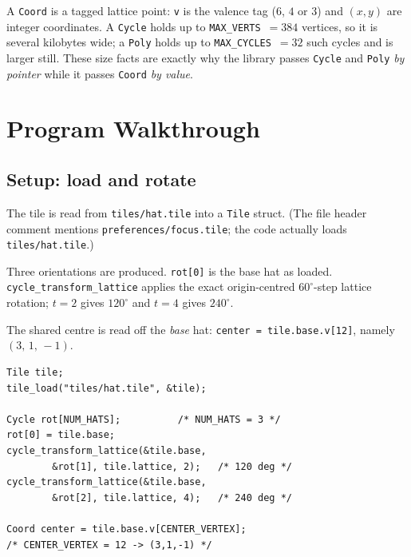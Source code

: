 \documentclass[10pt,a4paper]{article}
\let\polysection\section
\renewcommand\section{\needspace{0.16\textheight}\polysection}
\let\polysubsection\subsection
\renewcommand\subsection{\needspace{0.12\textheight}\polysubsection}
\newcommand{\code}[1]{\texttt{\small #1}}
\newcommand{\file}[1]{\texttt{\footnotesize #1}}
\newcommand{\vcoord}[3]{$(#1,\,#2,\,#3)$}
\newcommand{\panegap}{\hfill}
\begin{document}
\noindent A \code{Coord} is a tagged lattice point: \code{v} is the valence
tag ($6$, $4$ or $3$) and $(x,y)$ are integer coordinates.  A \code{Cycle}
holds up to \code{MAX\_VERTS}~$=384$ vertices, so it is several kilobytes
wide; a \code{Poly} holds up to \code{MAX\_CYCLES}~$=32$ such cycles and is
larger still.  These size facts are exactly why the library passes
\code{Cycle} and \code{Poly} \emph{by pointer} while it passes \code{Coord}
\emph{by value}.

\section{Program Walkthrough}

\subsection{Setup: load and rotate}

\par\medskip\noindent
\begin{minipage}[t]{0.46\linewidth}
\setlength{\parskip}{4pt}
The tile is read from \file{tiles/hat.tile} into a \code{Tile} struct.
(The file header comment mentions \file{preferences/focus.tile}; the code
actually loads \file{tiles/hat.tile}.)

Three orientations are produced.  \code{rot[0]} is the base hat as loaded.
\code{cycle\_transform\_lattice} applies the exact origin-centred
$60^\circ$-step lattice rotation; $t=2$ gives $120^\circ$ and $t=4$ gives
$240^\circ$.

The shared centre is read off the \emph{base} hat:
\code{center = tile.base.v[12]}, namely \vcoord{3}{1}{-1}.
\end{minipage}\panegap
\begin{minipage}[t]{0.50\linewidth}
\begin{verbatim}
Tile tile;
tile_load("tiles/hat.tile", &tile);

Cycle rot[NUM_HATS];          /* NUM_HATS = 3 */
rot[0] = tile.base;
cycle_transform_lattice(&tile.base,
        &rot[1], tile.lattice, 2);   /* 120 deg */
cycle_transform_lattice(&tile.base,
        &rot[2], tile.lattice, 4);   /* 240 deg */

Coord center = tile.base.v[CENTER_VERTEX];
/* CENTER_VERTEX = 12 -> (3,1,-1) */
\end{verbatim}
\end{minipage}
\par\medskip
\end{document}
